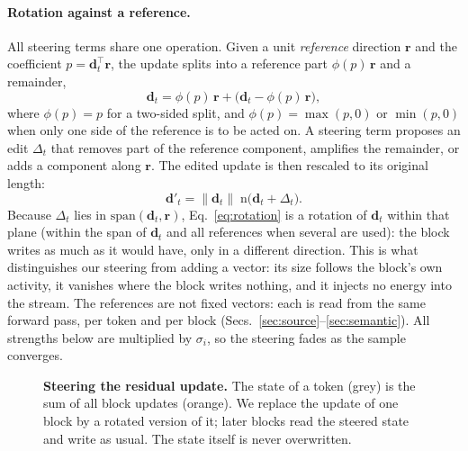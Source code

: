 \paragraph{Rotation against a reference.}
All steering terms share one operation. Given a unit \emph{reference} direction $\mathbf{r}$ and the
coefficient $p = \mathbf{d}_t^{\top}\mathbf{r}$, the update splits into a reference part
$\phi(p)\,\mathbf{r}$ and a remainder,
\begin{equation}
  \mathbf{d}_t = \phi(p)\,\mathbf{r} + \big(\mathbf{d}_t - \phi(p)\,\mathbf{r}\big),
  \label{eq:split}
\end{equation}
where $\phi(p) = p$ for a two-sided split, and $\phi(p) = \max(p,0)$ or $\min(p,0)$ when only one side of the
reference is to be acted on. A steering term proposes an edit $\Delta_t$ that removes part of the reference
component, amplifies the remainder, or adds a component along $\mathbf{r}$. The edited update is then rescaled
to its original length:
\begin{equation}
  \mathbf{d}'_t = \lVert \mathbf{d}_t \rVert \; \mathrm{n}\big(\mathbf{d}_t + \Delta_t\big) .
  \label{eq:rotation}
\end{equation}
Because $\Delta_t$ lies in $\mathrm{span}(\mathbf{d}_t, \mathbf{r})$, Eq.~\eqref{eq:rotation} is a rotation
of $\mathbf{d}_t$ within that plane (within the span of $\mathbf{d}_t$ and all references when several are
used): the block writes as much as it would have, only in a different direction.
This is what distinguishes our steering from adding a vector: its size follows the block's own activity,
it vanishes where the block writes nothing, and it injects no energy into the stream. The references are not
fixed vectors: each is read from the same forward pass, per token and per block
(Secs.~\ref{sec:source}--\ref{sec:semantic}). All strengths below are multiplied by $\sigma_i$, so the
steering fades as the sample converges.

\begin{figure}[t]
  \centering
  \caption{\textbf{Steering the residual update.} The state of a token (grey) is the sum of all block
  updates (orange). We replace the update of one block by a rotated version of it; later blocks read the
  steered state and write as usual. The state itself is never overwritten.}
  \label{fig:residual}
\end{figure}

